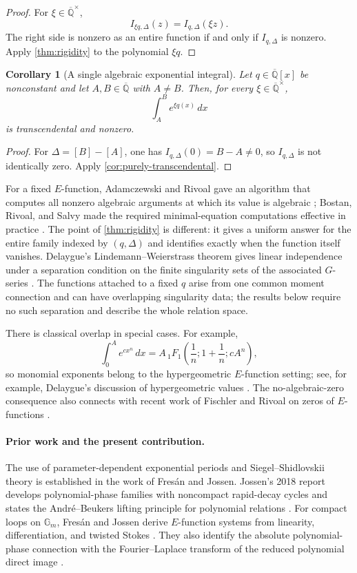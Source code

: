 \documentclass[11pt]{article}
\numberwithin{equation}{section}
\newtheorem{corollary}[corollary]{Corollary}
\theoremstyle{definition}
\theoremstyle{remark}
\newcommand{\Qbar}{\overline{\mathbb Q}}
\begin{document}
\begin{proof}
For $\xi\in\Qbar^\times$,
\[
  I_{\xi q,\Delta}(z)=I_{q,\Delta}(\xi z).
\]
The right side is nonzero as an entire function if and only if
$I_{q,\Delta}$ is nonzero.  Apply \cref{thm:rigidity} to the polynomial
$\xi q$.
\end{proof}

\begin{corollary}[A single algebraic exponential integral]
\label{cor:single}
Let $q\in\Qbar[x]$ be nonconstant and let $A,B\in\Qbar$ with $A\ne B$.
Then, for every $\xi\in\Qbar^\times$,
\[
  \int_A^B e^{\xi q(x)}\,dx
\]
is transcendental and nonzero.
\end{corollary}

\begin{proof}
For $\Delta=[B]-[A]$, one has $I_{q,\Delta}(0)=B-A\ne0$, so
$I_{q,\Delta}$ is not identically zero.  Apply
\cref{cor:purely-transcendental}.
\end{proof}

For a fixed $E$-function, Adamczewski and Rivoal gave an algorithm that
computes all nonzero algebraic arguments at which its value is algebraic
\cite{AdamczewskiRivoal}; Bostan, Rivoal, and Salvy made the required
minimal-equation computations effective in practice
\cite{BostanRivoalSalvy}.  The point of \cref{thm:rigidity} is different:
it gives a uniform answer for the entire family indexed by $(q,\Delta)$ and
identifies exactly when the function itself vanishes.  Delaygue's
Lindemann--Weierstrass theorem gives linear independence under a separation
condition on the finite singularity sets of the associated $G$-series
\cite{Delaygue}.  The functions attached to a fixed $q$ arise from one
common moment connection and can have overlapping singularity data; the
results below require no such separation and describe the whole relation
space.

There is classical overlap in special cases.  For example,
\[
  \int_0^A e^{cx^n}\,dx
  =A\,{}_1F_1\!\left(\frac1n;1+\frac1n;cA^n\right),
\]
so monomial exponents belong to the hypergeometric $E$-function setting;
see, for example, Delaygue's discussion of hypergeometric values
\cite{Delaygue}.  The no-algebraic-zero consequence also connects with
recent work of Fischler and Rivoal on zeros of $E$-functions
\cite{FischlerRivoalZeros}.

\paragraph{Prior work and the present contribution.}
The use of parameter-dependent exponential periods and
Siegel--Shidlovskii theory is established in the work of Fres\'an and
Jossen.  Jossen's 2018 report develops polynomial-phase families with
noncompact rapid-decay cycles and states the Andr\'e--Beukers lifting
principle for polynomial relations \cite[\S\S2--3]{Jossen2018}.
For compact loops on $\mathbb G_m$, Fres\'an and Jossen derive
$E$-function systems from linearity, differentiation, and twisted Stokes
\cite[\S12.7]{FresanJossenExp}.  They also identify the absolute
polynomial-phase connection with the Fourier--Laplace transform of the
reduced polynomial direct image \cite[Proposition~5.1]{FresanJossen}.
\end{document}
